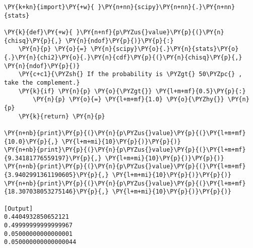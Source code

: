 \begin{Verbatim}[label=\makebox{\href{https://github.com/unipi-physics-labs/lab1-notes/tree/main/snippy/p_value.py}{https://github.com/.../p\_value.py}},commandchars=\\\{\}]
\PY{k+kn}{import}\PY{+w}{ }\PY{n+nn}{scipy}\PY{n+nn}{.}\PY{n+nn}{stats}

\PY{k}{def}\PY{+w}{ }\PY{n+nf}{p\PYZus{}value}\PY{p}{(}\PY{n}{chisq}\PY{p}{,} \PY{n}{ndof}\PY{p}{)}\PY{p}{:}
    \PY{n}{p} \PY{o}{=} \PY{n}{scipy}\PY{o}{.}\PY{n}{stats}\PY{o}{.}\PY{n}{chi2}\PY{o}{.}\PY{n}{cdf}\PY{p}{(}\PY{n}{chisq}\PY{p}{,} \PY{n}{ndof}\PY{p}{)}
    \PY{c+c1}{\PYZsh{} If the probability is \PYZgt{} 50\PYZpc{} , take the complement.}
    \PY{k}{if} \PY{n}{p} \PY{o}{\PYZgt{}} \PY{l+m+mf}{0.5}\PY{p}{:}
        \PY{n}{p} \PY{o}{=} \PY{l+m+mf}{1.0} \PY{o}{\PYZhy{}} \PY{n}{p}
    \PY{k}{return} \PY{n}{p}

\PY{n+nb}{print}\PY{p}{(}\PY{n}{p\PYZus{}value}\PY{p}{(}\PY{l+m+mf}{10.0}\PY{p}{,} \PY{l+m+mi}{10}\PY{p}{)}\PY{p}{)}
\PY{n+nb}{print}\PY{p}{(}\PY{n}{p\PYZus{}value}\PY{p}{(}\PY{l+m+mf}{9.34181776559197}\PY{p}{,} \PY{l+m+mi}{10}\PY{p}{)}\PY{p}{)}
\PY{n+nb}{print}\PY{p}{(}\PY{n}{p\PYZus{}value}\PY{p}{(}\PY{l+m+mf}{3.9402991361190605}\PY{p}{,} \PY{l+m+mi}{10}\PY{p}{)}\PY{p}{)}
\PY{n+nb}{print}\PY{p}{(}\PY{n}{p\PYZus{}value}\PY{p}{(}\PY{l+m+mf}{18.307038053275146}\PY{p}{,} \PY{l+m+mi}{10}\PY{p}{)}\PY{p}{)}

[Output]
0.4404932850652121
0.49999999999999967
0.05000000000000001
0.050000000000000044
\end{Verbatim}
